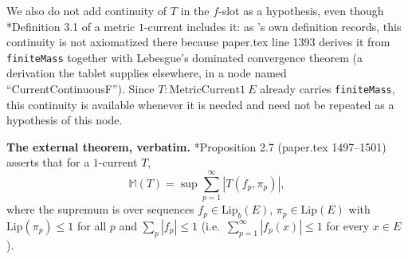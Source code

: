 \begin{definition}
  We also do not add continuity of $T$ in the $f$-slot as a hypothesis, even though
  \cite{AmbrosioKirchheim}*{Definition 3.1} of a metric $1$-current includes it: as
  's own definition records, this continuity is not axiomatized there
  because paper.tex line 1393 derives it from \texttt{finiteMass} together with Lebesgue's
  dominated convergence theorem (a derivation the tablet supplies elsewhere, in a node named
  ``CurrentContinuousF''). Since $T : \mathrm{MetricCurrent1}\ E$ already carries
  \texttt{finiteMass}, this continuity is available whenever it is needed and need not be repeated
  as a hypothesis of this node.

  \textbf{The external theorem, verbatim.} \cite{AmbrosioKirchheim}*{Proposition 2.7} (paper.tex
  1497--1501) asserts that for a $1$-current $T$,
  \[
    \mathbb{M}(T) = \sup \sum_{p=1}^\infty |T(f_p,\pi_p)|
    ,
  \]
  where the supremum is over sequences $f_p \in \mathrm{Lip}_b(E)$, $\pi_p \in \mathrm{Lip}(E)$
  with $\mathrm{Lip}(\pi_p) \le 1$ for all $p$ and $\sum_p |f_p| \le 1$ (i.e.\ $\sum_{p=1}^\infty
  |f_p(x)| \le 1$ for every $x \in E$).


\end{definition}
